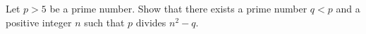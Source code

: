 Let $p > 5$ be a prime number. Show that there exists a prime number $q < p$ and a positive integer $n$ such that $p$ divides $n^2-q$.